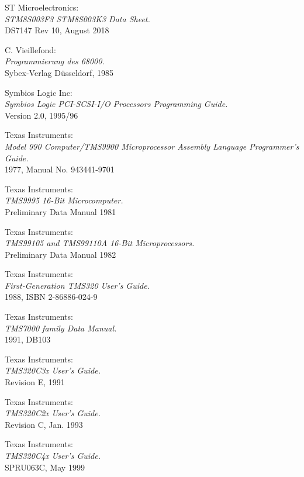  ST Microelectronics: \\
		{\em STM8S003F3 STM8S003K3 Data Sheet.\/} \\
		DS7147 Rev 10, August 2018

 C. Vieillefond: \\
		{\em Programmierung des 68000.\/} \\
		Sybex-Verlag D\"usseldorf, 1985

 Symbios Logic Inc: \\
		{\em Symbios Logic PCI-SCSI-I/O Processors Programming
		Guide.\/} \\
		Version 2.0, 1995/96

  Texas Instruments: \\
		{\em Model 990 Computer/TMS9900 Microprocessor
			Assembly Language Programmer's Guide.\/} \\
		1977, Manual No. 943441-9701

 Texas Instruments: \\
		{\em TMS9995 16-Bit Microcomputer.\/} \\
		Preliminary Data Manual
		1981

 Texas Instruments: \\
		{\em TMS99105 and TMS99110A 16-Bit Microprocessors.\/} \\
		Preliminary Data Manual
		1982

 Texas Instruments: \\
		{\em First-Generation TMS320 User's Guide.\/} \\
		1988, ISBN 2-86886-024-9

 Texas Instruments: \\
		{\em TMS7000 family Data Manual.\/} \\
		1991, DB103

 Texas Instruments: \\
		{\em TMS320C3x User's Guide.\/} \\
		Revision E, 1991

 Texas Instruments: \\
		{\em TMS320C2x User's Guide.\/} \\
		Revision C, Jan. 1993

 Texas Instruments: \\
		{\em TMS320C4x User's Guide.\/} \\
		SPRU063C, May 1999

